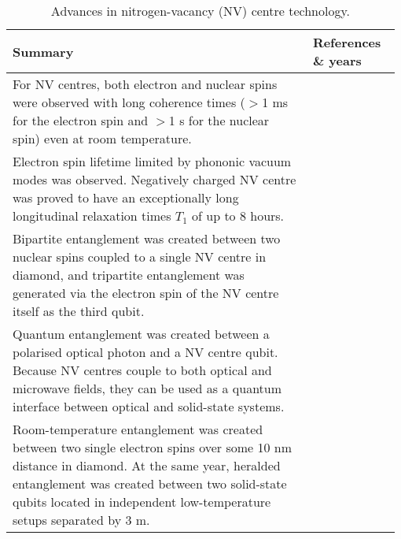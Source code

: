 \begin{table*}[!htbp]
	\begin{tabular}{|p{0.755\linewidth}|p{0.22\linewidth}|}
		\hline
	\textbf{Summary} & \textbf{References \& years} \\	\hline \hline
		For NV centres, both electron and nuclear spins were observed with long coherence times ($>$1 ms for the electron spin and $>$1 s for the nuclear spin) even at room temperature. &  \cite{bib:balasubramanian2009ultralong, bib:neumann2010quantum, bib:maurer2012room} \\
		\hline
		Electron spin lifetime limited by phononic vacuum modes was observed. Negatively charged NV centre was proved to have an exceptionally long longitudinal relaxation times $T_1$\index{T$_1$-time} of up to 8 hours. & \cite{bib:astner2018solid} \\
		\hline
		Bipartite entanglement was created between two nuclear spins coupled to a single NV centre in diamond, and tripartite entanglement was generated via the electron spin of the NV centre itself as the third qubit. & \cite{bib:neumann2008multipartite} \\
		\hline
		Quantum entanglement was created between a polarised optical photon and a NV centre qubit. Because NV centres couple to both optical and microwave fields, they can be used as a quantum interface between optical and solid-state systems.  & \cite{bib:togan2010quantum}\\
		\hline
		Room-temperature entanglement was created between two single electron spins over some 10 nm distance in diamond. At the same year, heralded entanglement was created between two solid-state qubits located in independent low-temperature setups separated by 3 m. & \cite{bib:dolde2013room, bib:bernien2013heralded} \\
		\hline
	\end{tabular}
	\captionspacetab \caption{Advances in nitrogen-vacancy (NV) centre technology.} \label{tab:NV_centres}
\end{table*}

